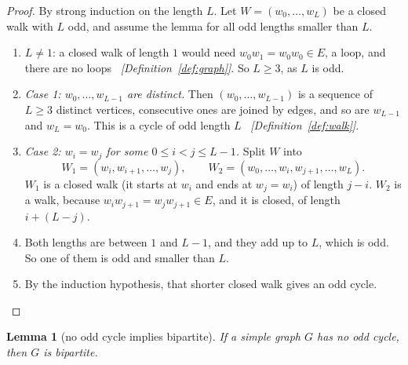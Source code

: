 \documentclass[11pt]{article}
\theoremstyle{plain}
\newtheorem{lemma}[theorem]{Lemma}
\theoremstyle{definition}
\theoremstyle{remark}
\newcommand{\why}[1]{\unskip\ \textit{[#1]}}
\newenvironment{steps}{\begin{enumerate}[label=(\arabic*),leftmargin=2.2em,itemsep=0.35em]}{\end{enumerate}}
\begin{document}
\begin{proof}
By strong induction on the length $L$. Let $W=(w_0,\dots,w_L)$ be a closed walk with $L$ odd,
and assume the lemma for all odd lengths smaller than $L$.
\begin{steps}
  \item $L\ne 1$: a closed walk of length $1$ would need $w_0w_1=w_0w_0\in E$, a loop, and there
    are no loops \why{Definition~\ref{def:graph}}. So $L\ge 3$, as $L$ is odd.
  \item \emph{Case 1: $w_0,\dots,w_{L-1}$ are distinct.} Then $(w_0,\dots,w_{L-1})$ is a
    sequence of $L\ge 3$ distinct vertices, consecutive ones are joined by edges, and so are
    $w_{L-1}$ and $w_L=w_0$. This is a cycle of odd length $L$ \why{Definition~\ref{def:walk}}.
  \item \emph{Case 2: $w_i=w_j$ for some $0\le i<j\le L-1$.} Split $W$ into
    \[ W_1=(w_i,w_{i+1},\dots,w_j),\qquad W_2=(w_0,\dots,w_i,w_{j+1},\dots,w_L). \]
    $W_1$ is a closed walk (it starts at $w_i$ and ends at $w_j=w_i$) of length $j-i$. $W_2$ is
    a walk, because $w_iw_{j+1}=w_jw_{j+1}\in E$, and it is closed, of length $i+(L-j)$.
  \item Both lengths are between $1$ and $L-1$, and they add up to $L$, which is odd. So one of
    them is odd and smaller than $L$.
  \item By the induction hypothesis, that shorter closed walk gives an odd cycle. \qedhere
\end{steps}
\end{proof}

\begin{lemma}[no odd cycle implies bipartite]\label{lem:bipartite}
If a simple graph $G$ has no odd cycle, then $G$ is bipartite.
\end{lemma}
\end{document}
